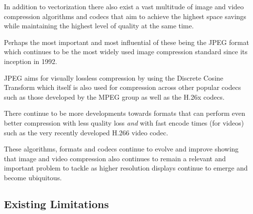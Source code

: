 \documentclass[12pt]{article}
\newcommand{\sentence}{} %
\newcommand{\italic}[1]{\textit{#1}}
\begin{document}
    \bigskip
    In addition to vectorization there also exist a vast multitude of image and video compression algorithms and
    codecs that aim to achieve the highest space savings while maintaining the highest level of quality at the same
    time.
    \sentence
    Perhaps the most important and most influential of these being the JPEG format which continues to be the most
    widely used image compression standard since its inception in 1992\cite{pennebaker1992jpeg}.
    \sentence
    JPEG aims for visually lossless compression by using the Discrete Cosine Transform which itself is also used for
    compression across other popular codecs such as those developed by the MPEG group as well as the H.26x codecs\cite{richardson2004h}.
    \sentence
    There continue to be more developments towards formats that can perform even better compression with less quality
    loss \italic{and} with fast encode times (for videos) such as the very recently developed H.266 video codec.
    \sentence
    These algorithms, formats and codecs continue to evolve and improve showing that image and video compression also
    continues to remain a relevant and important problem to tackle as higher resolution displays continue to emerge
    and become ubiquitous.

    \subsection{Existing Limitations}\label{subsec:existing-limitations}
\end{document}
